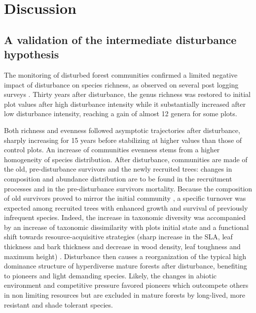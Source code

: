 \documentclass[fleqn,10pt]{ArtEcoFoG} %
\theoremstyle{definition}
\theoremstyle{definition}
\theoremstyle{definition}
\theoremstyle{remark}
\begin{document}
\section{Discussion}\label{discussion}

\subsection{A validation of the intermediate disturbance
hypothesis}\label{a-validation-of-the-intermediate-disturbance-hypothesis}

The monitoring of disturbed forest communities confirmed a limited
negative impact of disturbance on species richness, as observed on
several post logging surveys \citep{Cannon1998, Baraloto2012a}. Thirty
years after disturbance, the genus richness was restored to initial plot
values after high disturbance intensity while it substantially increased
after low disturbance intensity, reaching a gain of almost 12 genera for
some plots.

Both richness and evenness followed asymptotic trajectories after
disturbance, sharply increasing for 15 years before stabilizing at
higher values than those of control plots. An increase of communities
evenness stems from a higher homogeneity of species distribution. After
disturbance, communities are made of the old, pre-disturbance survivors
and the newly recruited trees: changes in composition and abundance
distribution are to be found in the recruitment processes and in the
pre-disturbance survivors mortality. Because the composition of old
survivors proved to mirror the initial community \citep{Herault2018}, a
specific turnover was expected among recruited trees with enhanced
growth and survival of previously infrequent species. Indeed, the
increase in taxonomic diversity was accompanied by an increase of
taxonomic dissimilarity with plots initial state and a functional shift
towards resource-acquisitive strategies (sharp increase in the SLA, leaf
thickness and bark thickness and decrease in wood density, leaf
toughness and maximum height)
\citep{Westoby1998, Wright2004, Reich2014}. Disturbance then causes a
reorganization of the typical high dominance structure of hyperdiverse
mature forests after disturbance, benefiting to pioneers and light
demanding species. Likely, the changes in abiotic environment and
competitive pressure favored pioneers which outcompete others in non
limiting resources but are excluded in mature forests by long-lived,
more resistant and shade tolerant species.
\end{document}
